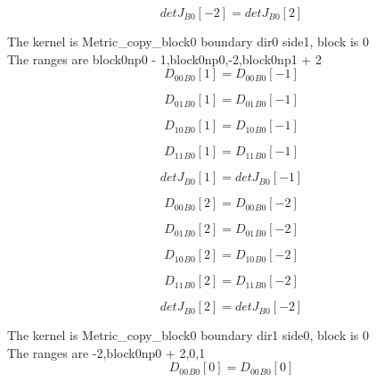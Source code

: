 \documentclass{article}
\begin{document}
\begin{dmath}{detJ{_{B0}}}[{-2}] = {detJ{_{B0}}}[{2}]\end{dmath}

\noindent The kernel is Metric_copy_block0 boundary dir0 side1, block is 0\\\noindent The ranges are block0np0 - 1,block0np0,-2,block0np1 + 2\\\begin{dmath}{D_{00}{_{B0}}}[{1}] = {D_{00}{_{B0}}}[{-1}]\end{dmath}

\begin{dmath}{D_{01}{_{B0}}}[{1}] = {D_{01}{_{B0}}}[{-1}]\end{dmath}

\begin{dmath}{D_{10}{_{B0}}}[{1}] = {D_{10}{_{B0}}}[{-1}]\end{dmath}

\begin{dmath}{D_{11}{_{B0}}}[{1}] = {D_{11}{_{B0}}}[{-1}]\end{dmath}

\begin{dmath}{detJ{_{B0}}}[{1}] = {detJ{_{B0}}}[{-1}]\end{dmath}

\begin{dmath}{D_{00}{_{B0}}}[{2}] = {D_{00}{_{B0}}}[{-2}]\end{dmath}

\begin{dmath}{D_{01}{_{B0}}}[{2}] = {D_{01}{_{B0}}}[{-2}]\end{dmath}

\begin{dmath}{D_{10}{_{B0}}}[{2}] = {D_{10}{_{B0}}}[{-2}]\end{dmath}

\begin{dmath}{D_{11}{_{B0}}}[{2}] = {D_{11}{_{B0}}}[{-2}]\end{dmath}

\begin{dmath}{detJ{_{B0}}}[{2}] = {detJ{_{B0}}}[{-2}]\end{dmath}

\noindent The kernel is Metric_copy_block0 boundary dir1 side0, block is 0\\\noindent The ranges are -2,block0np0 + 2,0,1\\\begin{dmath}{D_{00}{_{B0}}}[{0}] = {D_{00}{_{B0}}}[{0}]\end{dmath}
\end{document}
